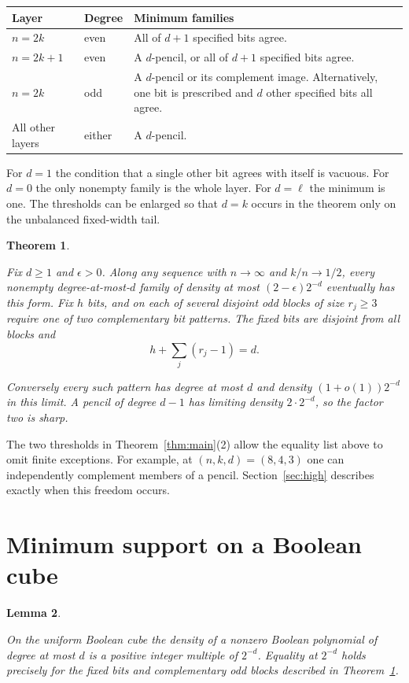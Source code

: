 \documentclass[11pt,letterpaper]{article}
\newtheorem{theorem}{Theorem}[section]
\newtheorem{lemma}[theorem]{Lemma}
\numberwithin{equation}{section}
\begin{document}
\begin{center}\normalfont
\begin{tabularx}{\linewidth}{@{}llX@{}}
\toprule
Layer & Degree & Minimum families \\
\midrule
$n=2k$ & even & All of $d+1$ specified bits agree. \\
$n=2k+1$ & even & A $d$-pencil, or all of $d+1$ specified bits agree. \\
$n=2k$ & odd & A $d$-pencil or its complement image. Alternatively, one bit is prescribed and $d$ other specified bits all agree. \\
All other layers & either & A $d$-pencil. \\
\bottomrule
\end{tabularx}
\end{center}

For $d=1$ the condition that a single other bit agrees with itself is vacuous. For $d=0$ the
only nonempty family is the whole layer. For $d=\ell$ the minimum is one. The thresholds can
be enlarged so that $d=k$ occurs in the theorem only on the unbalanced fixed-width tail.

\begin{theorem}\label{thm:stability}

Fix $d\ge1$ and $\epsilon>0$. Along any sequence with $n\to\infty$ and $k/n\to1/2$, every
nonempty degree-at-most-$d$ family of density at most $(2-\epsilon)2^{-d}$ eventually has this
form. Fix $h$ bits, and on each of several disjoint odd blocks of size $r_j\ge3$ require one
of two complementary bit patterns. The fixed bits are disjoint from all blocks and
\[
h+\sum_j(r_j-1)=d.
\]

Conversely every such pattern has degree at most $d$ and density $(1+o(1))2^{-d}$ in this
limit. A pencil of degree $d-1$ has limiting density $2\cdot 2^{-d}$, so the factor two is
sharp.
\end{theorem}

The two thresholds in Theorem~\ref{thm:main}(2) allow the equality list above to omit finite
exceptions. For example, at $(n,k,d)=(8,4,3)$ one can independently complement members of a
pencil. Section~\ref{sec:high} describes exactly when this freedom occurs.

\section{Minimum support on a Boolean cube}\label{sec:cube}

\begin{lemma}\label{lem:cube}

On the uniform Boolean cube the density of a nonzero Boolean polynomial of degree at most $d$
is a positive integer multiple of $2^{-d}$. Equality at $2^{-d}$ holds precisely for the fixed
bits and complementary odd blocks described in Theorem~\ref{thm:stability}.
\end{lemma}
\end{document}
